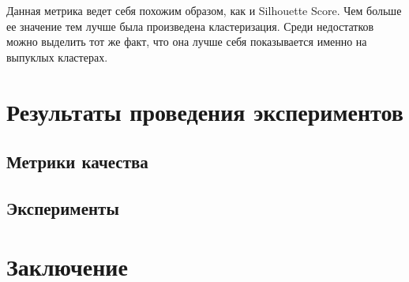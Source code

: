 Данная метрика ведет себя похожим образом, как и Silhouette Score. Чем больше ее значение тем лучше была произведена кластеризация. Среди недостатков можно выделить тот же факт, что она лучше себя показывается именно на выпуклых кластерах.

\newpage
\section{Результаты проведения экспериментов}

\subsection{Метрики качества}

\subsection{Эксперименты}

\newpage
\section{Заключение}